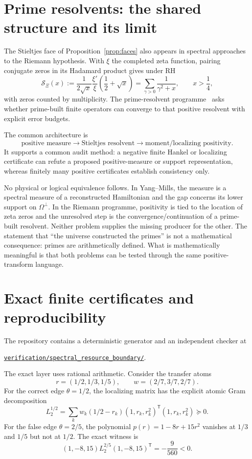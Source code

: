 \documentclass[11pt,a4paper]{article}
\theoremstyle{definition}
\theoremstyle{remark}
\begin{document}
\section{Prime resolvents: the shared structure and its limit}
\label{sec:riemann}

The Stieltjes face of Proposition~\ref{prop:faces} also appears in spectral
approaches to the Riemann hypothesis.  With $\xi$ the completed zeta function,
pairing conjugate zeros in its Hadamard product gives under RH
\cite{TitchmarshZeta}
\[
  \mathcal S_\Xi(x)
  :=\frac{1}{2\sqrt{x}}\frac{\xi'}{\xi}
      \left(\frac12+\sqrt{x}\right)
  =\sum_{\gamma>0}\frac{1}{\gamma^2+x},
  \qquad x>\frac14,
  \label{eq:xi-stieltjes}
\]
with zeros counted by multiplicity.  The prime-resolvent
programme~\cite{PrimeResolvent} asks whether prime-built finite operators can
converge to that positive resolvent with explicit error budgets.

The common architecture is
\[
  \text{positive measure}
  \longrightarrow
  \text{Stieltjes resolvent}
  \longrightarrow
  \text{moment/localizing positivity}.
\]
It supports a common audit method: a negative finite Hankel or localizing
certificate can refute a proposed positive-measure or support representation,
whereas finitely many positive certificates establish consistency only.

No physical or logical equivalence follows.  In Yang--Mills, the measure is a
spectral measure of a reconstructed Hamiltonian and the gap concerns its lower
support on $\Omega^\perp$.  In the Riemann programme, positivity is tied to the
location of zeta zeros and the unresolved step is the convergence/continuation
of a prime-built resolvent.  Neither problem supplies the missing producer for
the other.  The statement that ``the universe constructed the primes'' is not
a mathematical consequence: primes are arithmetically defined.  What is
mathematically meaningful is that both problems can be tested through the same
positive-transform language.

\section{Exact finite certificates and reproducibility}
\label{sec:verification}

The repository contains a deterministic generator and an independent checker
at
\begin{center}
\href{https://github.com/lluiseriksson/aqft-split-inclusion-series/tree/agent/positive-spectral-resource-boundaries/verification/spectral_resource_boundary}
{\texttt{verification/spectral\_resource\_boundary/}}.
\end{center}
The exact layer uses rational arithmetic.  Consider the transfer atoms
\[
  r=(1/2,1/3,1/5),\qquad w=(2/7,3/7,2/7).
\]
For the correct edge $\theta=1/2$, the localizing matrix has the explicit
atomic Gram decomposition
\[
  L_2^{1/2}=\sum_k w_k(1/2-r_k)
  (1,r_k,r_k^2)^{\mathsf T}(1,r_k,r_k^2)\succeq0.
\]
For the false edge $\theta=2/5$, the polynomial
$p(r)=1-8r+15r^2$ vanishes at $1/3$ and $1/5$ but not at $1/2$.  The exact
witness is
\[
  (1,-8,15)L_2^{2/5}(1,-8,15)^{\mathsf T}=-\frac9{560}<0.
\]
\end{document}
